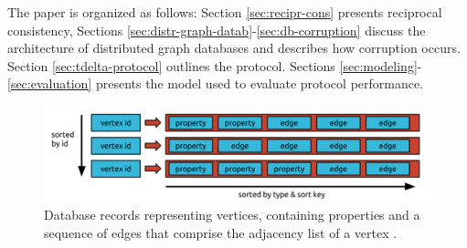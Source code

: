 The paper is organized as follows: Section \ref{sec:recipr-cons} presents reciprocal consistency, Sections \ref{sec:distr-graph-datab}-\ref{sec:db-corruption} discuss the architecture of distributed graph databases and describes how corruption occurs. Section \ref{sec:tdelta-protocol} outlines the \tDelta protocol. Sections \ref{sec:modeling}-\ref{sec:evaluation} presents the model used to evaluate protocol performance.

\begin{figure}[ht!]
  \centering
  \includegraphics[width=\linewidth]{./figures/janusgraph-adj-list}
  \caption{Database records representing vertices, containing properties and a sequence of edges that comprise the adjacency list of a vertex \cite{janusgraph}.}
  \label{adj-list}
\end{figure}